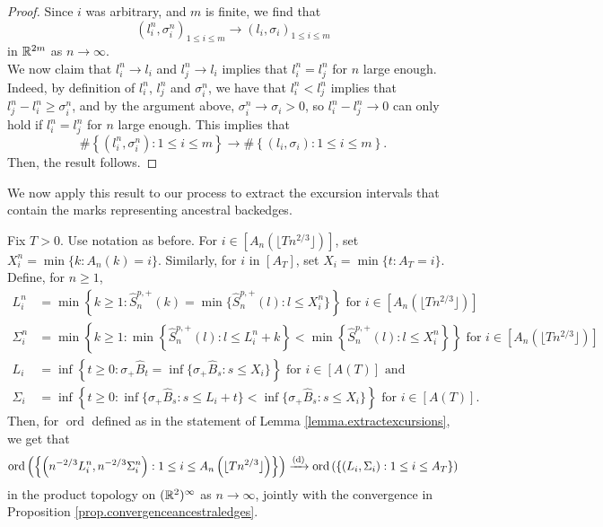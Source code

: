 \begin{proof}
Since $i$ was arbitrary, and $m$ is finite, we find that $$(l_i^n,\sigma_i^n)_{1\leq i\leq m}\to (l_i,\sigma_i)_{1\leq i\leq m}$$
in ${\mathbb R}^{2m}$ as $n\to \infty$. \\
We now claim that $l_i^n\to l_i$ and $l_j^n\to l_i$ implies that $l_i^n=l_j^n$ for $n$ large enough. Indeed, by definition of $l_i^n$, $l_j^n$ and $\sigma_i^n$, we have that $l_i^n<l_j^n$ implies that $l_j^n-l_i^n\geq \sigma_i^n$, and by the argument above, $\sigma_i^n\to \sigma_i>0$, so $l_i^n-l_j^n\to 0$ can only hold if $l_i^n=l_j^n$ for $n$ large enough. This implies that 
$$\#\left\{(l_i^n,\sigma_i^n):1\leq i \leq m\right\}\to \#\left\{(l_i,\sigma_i):1\leq i \leq m\right\}.$$
Then, the result follows.
\end{proof}

We now apply this result to our process to extract the excursion intervals that contain the marks representing ancestral backedges.
\begin{proposition}\label{prop.extractexcursions}
Fix $T>0$. Use notation as before. For $i\in \left[A_n\left(\lfloor T n^{2/3}\rfloor\right)\right]$, set $X_i^n=\min\{k:A_n(k)=i\}$. Similarly, for $i$ in $\left[A_T\right]$, set $X_i=\min\{t:A_T=i\}$. Define, for $n\geq 1$,
\begin{align*}L_i^n&=\min\left\{k\geq 1:\hat{S}^{p,+}_n(k)=\min\{\hat{S}^{p,+}_n(l):l\leq X_i^n\}\right\}\text{ for }i\in \left[A_n\left(\lfloor T n^{2/3}\rfloor\right)\right]\\
\Sigma_i^n&=\min\left\{k \geq 1: \min\left\{\hat{S}^{p,+}_n(l):l\leq L_i^n+k\right\} < \min\left\{\hat{S}^{p,+}_n(l):l\leq X_i^n\right\}\right\}\text{ for }i\in \left[A_n\left(\lfloor T n^{2/3}\rfloor\right)\right]\\
L_i&=\inf\left\{t\geq 0:\sigma_+\hat{B}_t=\inf\{\sigma_+\hat{B}_s:s\leq X_i\}\right\}\text{ for }i\in \left[A(T )\right]\text{ and}\\
\Sigma_i&=\inf\left\{ t\geq 0: \inf\{\sigma_+\hat{B}_s:s\leq L_i+t\} < \inf\{\sigma_+\hat{B}_s:s\leq X_i\}\right\}\text{ for }i\in \left[A(T )\right].
\end{align*}
Then, for $\operatorname{ord}$ defined as in the statement of Lemma \ref{lemma.extractexcursions}, we get that
$$\operatorname{ord}\left(\left\{\left(n^{-2/3}L_i^n,n^{-2/3}\Sigma_i^n\right):1\leq i \leq A_n\left(\lfloor T n^{2/3}\rfloor\right)\right\}\right)\xrightarrow[]{\mathrm{(d)}} \operatorname{ord}\left(\left\{(L_i,\Sigma_i):1\leq i \leq A_T\right\}\right)$$
in the product topology on $({\mathbb R}^2)^\infty$ as $n\to \infty$, jointly with the convergence in Proposition \ref{prop.convergenceancestraledges}. 
\end{proposition}
